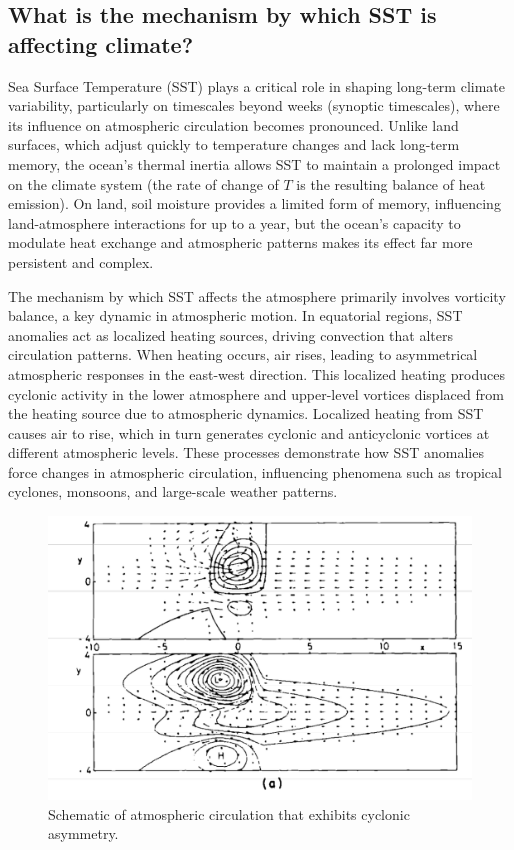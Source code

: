 \subsection{What is the mechanism by which SST is affecting climate?}

Sea Surface Temperature (SST) plays a critical role in shaping long-term climate variability, particularly on timescales beyond weeks (synoptic timescales), where its influence on atmospheric circulation becomes pronounced. Unlike land surfaces, which adjust quickly to temperature changes and lack long-term memory, the ocean's thermal inertia allows SST to maintain a prolonged impact on the climate system (the rate of change of $T$ is the resulting balance of heat emission). On land, soil moisture provides a limited form of memory, influencing land-atmosphere interactions for up to a year, but the ocean’s capacity to modulate heat exchange and atmospheric patterns makes its effect far more persistent and complex.

The mechanism by which SST affects the atmosphere primarily involves vorticity balance, a key dynamic in atmospheric motion. In equatorial regions, SST anomalies act as localized heating sources, driving convection that alters circulation patterns. When heating occurs, air rises, leading to asymmetrical atmospheric responses in the east-west direction. This localized heating produces cyclonic activity in the lower atmosphere and upper-level vortices displaced from the heating source due to atmospheric dynamics. Localized heating from SST causes air to rise, which in turn generates cyclonic and anticyclonic vortices at different atmospheric levels.  These processes demonstrate how SST anomalies force changes in atmospheric circulation, influencing phenomena such as tropical cyclones, monsoons, and large-scale weather patterns.

\begin{figure}[htp!]
	\centering
	\includegraphics[width=0.4\linewidth]{uploads/Screenshot 2024-11-26 100719.png}
	\caption{Schematic of atmospheric circulation that exhibits cyclonic asymmetry.}
	\label{fig:enter-label}
\end{figure}



